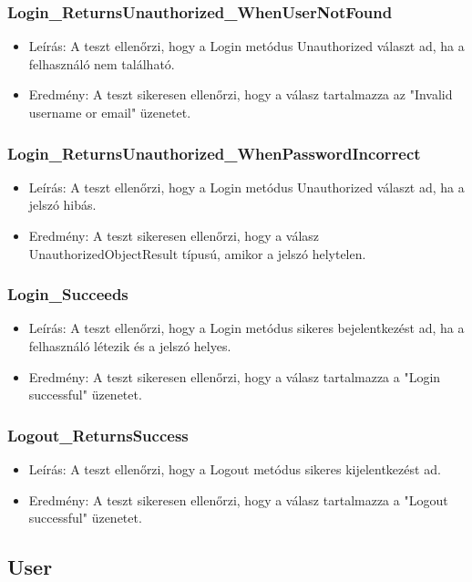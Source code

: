 \documentclass[11pt]{article}
\begin{document}
\subsubsection{Login\_ReturnsUnauthorized\_WhenUserNotFound}
\label{sec:org1b176c3}
\begin{itemize}
\item Leírás: A teszt ellenőrzi, hogy a Login metódus Unauthorized választ ad, ha a felhasználó nem található.
\item Eredmény: A teszt sikeresen ellenőrzi, hogy a válasz tartalmazza az "Invalid username or email" üzenetet.
\end{itemize}
\subsubsection{Login\_ReturnsUnauthorized\_WhenPasswordIncorrect}
\label{sec:org78db620}
\begin{itemize}
\item Leírás: A teszt ellenőrzi, hogy a Login metódus Unauthorized választ ad, ha a jelszó hibás.
\item Eredmény: A teszt sikeresen ellenőrzi, hogy a válasz UnauthorizedObjectResult típusú, amikor a jelszó helytelen.
\end{itemize}
\subsubsection{Login\_Succeeds}
\label{sec:orgeab1c7d}
\begin{itemize}
\item Leírás: A teszt ellenőrzi, hogy a Login metódus sikeres bejelentkezést ad, ha a felhasználó létezik és a jelszó helyes.
\item Eredmény: A teszt sikeresen ellenőrzi, hogy a válasz tartalmazza a "Login successful" üzenetet.
\end{itemize}
\subsubsection{Logout\_ReturnsSuccess}
\label{sec:org8e1bb93}
\begin{itemize}
\item Leírás: A teszt ellenőrzi, hogy a Logout metódus sikeres kijelentkezést ad.
\item Eredmény: A teszt sikeresen ellenőrzi, hogy a válasz tartalmazza a "Logout successful" üzenetet.
\end{itemize}
\subsection{User}
\label{sec:org26eb3b9}
\end{document}

